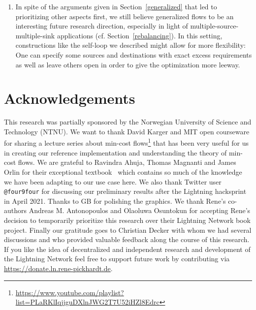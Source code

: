 \documentclass[10pt,twocolumn]{article}
\begin{document}
\begin{enumerate}
\item  In spite of the arguments given in Section~\ref{generalized} that led to prioritizing other aspects first, we still believe generalized flows to be an interesting future research direction, especially in light of multiple-source-multiple-sink applications (cf. Section~\ref{rebalancing}). In this setting, constructions like the self-loop we described might allow for more flexibility: One can specify some sources and destinations with exact excess requirements as well as leave others open in order to give the optimization more leeway.

\end{enumerate}

\section{Acknowledgements}
This research was partially sponsored by the Norwegian University of Science and Technology (NTNU).
We want to thank David Karger and MIT open courseware for sharing a lecture series about min-cost flows\footnote{\url{https://www.youtube.com/playlist?list=PLaRKlIqjjguDXlnJWG2T7U52iHZl8Edrc}} that has been very useful for us in creating our reference implementation and understanding the theory of min-cost flows.
We are grateful to Ravindra Ahuja, Thomas Magnanti and James Orlin for their exceptional textbook~\cite{ahuja1993network} which contains so much of the knowledge we have been adapting to our use case here.
We also thank Twitter user \texttt{@four9four} for discussing our preliminary results after the Lightning hacksprint in April 2021.
Thanks to GB for polishing the graphics.
We thank Rene's co-authors Andreas M. Antonopoulos and Olaoluwa Osuntokun for accepting Rene's decision to temporarily prioritize this research over their Lightning Network book project.
Finally our gratitude goes to Christian Decker with whom we had several discussions and who provided valuable feedback along the course of this research.
If you like the idea of decentralized and independent research and development of the Lightning Network feel free to support future work by contributing via \url{https://donate.ln.rene-pickhardt.de}.





\end{document}
